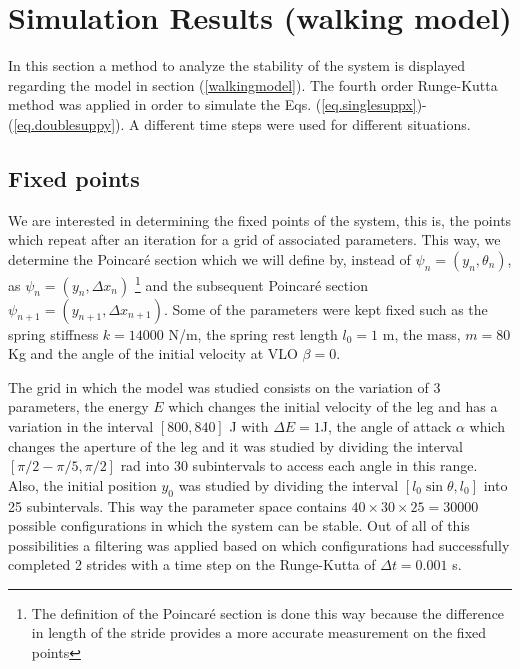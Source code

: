 \section{Simulation Results (walking model)}\label{simulation}
In this section a method to analyze the stability of the system is displayed regarding the model in section (\ref{walkingmodel}). The fourth order Runge-Kutta method \cite{runge} was applied in order to simulate the Eqs. (\ref{eq.singlesuppx})-(\ref{eq.doublesuppy}). A different time steps were  used for different situations.
\subsection{Fixed points}\label{pontosfixos}
We are interested in determining the fixed points of the system, this is, the points which repeat after an iteration for a grid of associated parameters. This way, we determine the Poincaré section which we will define by, instead of $\psi_n=(y_n,\theta_n)$, as  $\psi_n=(y_n,\Delta x_n)$ \footnote{The definition of the Poincaré section is done this way because the difference in length of the stride provides a more accurate measurement on  the fixed points} and the subsequent Poincaré section $\psi_{n+1}=(y_{n+1},\Delta x_{n+1})$. Some of the parameters were kept fixed such as the spring stiffness $k=14000$ N/m, the spring rest length $l_0=1$ m, the mass, $m=80$ Kg and the angle of the initial velocity at VLO $\beta=0$.

The grid in which the model was studied consists on the variation of 3 parameters, the energy $E$  which changes the initial velocity of the leg and has a variation in the interval $[800,840]$ J with $\Delta E = 1$J, the angle of attack $\alpha$ which changes the aperture of the leg and it was studied by dividing the interval $[\pi/2-\pi/5,\pi/2]$ rad into 30 subintervals to access each angle in this range. Also, the initial position $y_0$ was studied by dividing the interval $[l_0 \sin{\theta}, l_0]$ into 25 subintervals. This way the parameter space contains $40 \times 30 \times 25 = 30000$ possible configurations in which the system can be stable. Out of all of this possibilities a filtering was applied based on which configurations had successfully completed 2 strides with a time step on the Runge-Kutta of $\Delta t= 0.001$ s.

